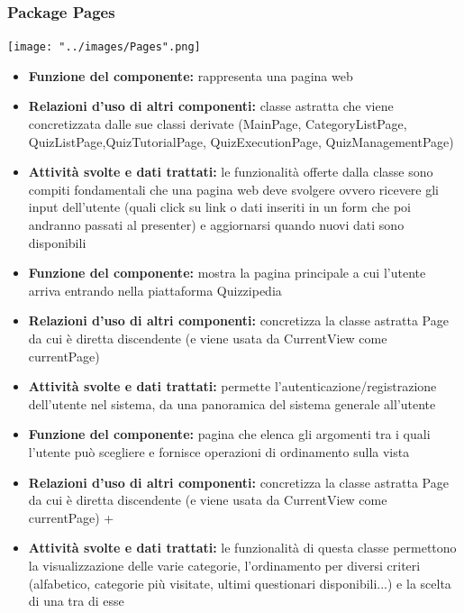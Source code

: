 \rigaregistro{0.0.17}{Luca Alessio (Progettista)}{12/05/2016}{Termine stesura sezione diagrammi e revisione/ampliamento di vari paragrafi}\documentclass[a4paper,11pt]{article}
\begin{document}
			\subsubsection{Package Pages}
			\begin{center}
				\centerline{\texttt{[image: "../images/Pages".png]}}
			\end{center}
			\begin{itemize}
		    \item\textbf{Funzione del componente:} rappresenta una pagina web
			\item\textbf{Relazioni d'uso di altri componenti:} classe astratta che viene concretizzata dalle sue classi derivate (MainPage, CategoryListPage, QuizListPage,QuizTutorialPage, QuizExecutionPage, QuizManagementPage)
			\item\textbf{Attività svolte e dati trattati:} le funzionalità offerte dalla classe sono compiti fondamentali che una pagina web deve svolgere ovvero ricevere gli input dell'utente (quali click su link o dati inseriti in un form che poi andranno passati al presenter) e aggiornarsi quando nuovi dati sono disponibili
			\end{itemize}
			\begin{itemize}
		    \item\textbf{Funzione del componente:} mostra la pagina principale a cui l'utente arriva entrando nella piattaforma Quizzipedia 
			\item\textbf{Relazioni d'uso di altri componenti:} concretizza la classe astratta Page da cui è diretta discendente (e viene usata da CurrentView come currentPage)
			\item\textbf{Attività svolte e dati trattati:} permette l'autenticazione/registrazione dell'utente nel sistema, da una panoramica del sistema generale all'utente
			\end{itemize}
			\begin{itemize}
		    \item\textbf{Funzione del componente:} pagina che elenca gli argomenti tra i quali l'utente può scegliere e fornisce operazioni di ordinamento sulla vista 
			\item\textbf{Relazioni d'uso di altri componenti:} concretizza la classe astratta Page da cui è diretta discendente (e viene usata da CurrentView come currentPage)
 +			\item\textbf{Attività svolte e dati trattati:} le funzionalità di questa classe permettono la visualizzazione delle varie categorie, l'ordinamento per diversi criteri (alfabetico, categorie più visitate, ultimi questionari disponibili...) e la scelta di una tra di esse
			\end{itemize}
\end{document}
